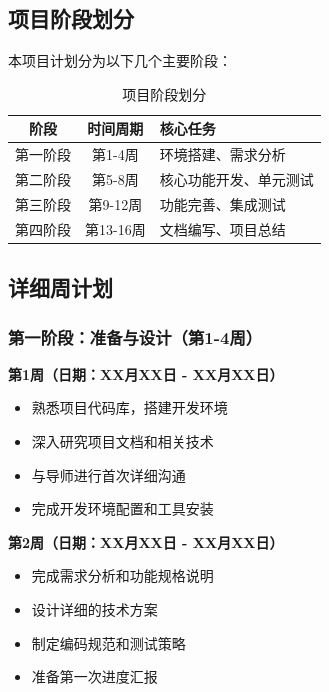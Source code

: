 \documentclass[a4paper,12pt]{article}
\begin{document}
\subsection{项目阶段划分}

本项目计划分为以下几个主要阶段：

\begin{table}[H]
\centering
\begin{tabular}{|c|c|l|}
\hline
\textbf{阶段} & \textbf{时间周期} & \textbf{核心任务} \\
\hline
第一阶段 & 第1-4周 & 环境搭建、需求分析 \\
\hline
第二阶段 & 第5-8周 & 核心功能开发、单元测试 \\
\hline
第三阶段 & 第9-12周 & 功能完善、集成测试 \\
\hline
第四阶段 & 第13-16周 & 文档编写、项目总结 \\
\hline
\end{tabular}
\caption{项目阶段划分}
\end{table}

\subsection{详细周计划}

\subsubsection{第一阶段：准备与设计（第1-4周）}

\textbf{第1周（日期：XX月XX日 - XX月XX日）}
\begin{itemize}
    \item 熟悉项目代码库，搭建开发环境
    \item 深入研究项目文档和相关技术
    \item 与导师进行首次详细沟通
    \item 完成开发环境配置和工具安装
\end{itemize}

\textbf{第2周（日期：XX月XX日 - XX月XX日）}
\begin{itemize}
    \item 完成需求分析和功能规格说明
    \item 设计详细的技术方案
    \item 制定编码规范和测试策略
    \item 准备第一次进度汇报
\end{itemize}
\end{document}
